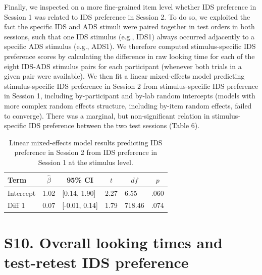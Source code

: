\documentclass[
  english,
  man, donotrepeattitle,floatsintext]{apa6}
\begin{document}
Finally, we inspected on a more fine-grained item level whether IDS preference in Session 1 was related to IDS preference in Session 2.
To do so, we exploited the fact the specific IDS and ADS stimuli were paired together in test orders in both sessions, such that one IDS stimulus (e.g., IDS1) always occurred adjacently to a specific ADS stimulus (e.g., ADS1).
We therefore computed stimulus-specific IDS preference scores by calculating the difference in raw looking time for each of the eight IDS-ADS stimulus pairs for each participant (whenever both trials in a given pair were available).
We then fit a linear mixed-effects model predicting stimulus-specific IDS preference in Session 2 from stimulus-specific IDS preference in Session 1, including by-participant and by-lab random intercepts (models with more complex random effects structure, including by-item random effects, failed to converge).
There was a marginal, but non-significant relation in stimulus-specific IDS preference between the two test sessions (Table 6).

\begin{table}[tbp]

\begin{center}
\begin{threeparttable}

\caption{\label{tab:unnamed-chunk-42}Linear mixed-effects model results predicting IDS preference in Session 2 from IDS preference in Session 1 at the stimulus level.}

\begin{tabular}{llllll}
\toprule
Term & \multicolumn{1}{c}{$\hat{\beta}$} & \multicolumn{1}{c}{95\% CI} & \multicolumn{1}{c}{$t$} & \multicolumn{1}{c}{$\mathit{df}$} & \multicolumn{1}{c}{$p$}\\
\midrule
Intercept & 1.02 & {}[0.14, 1.90] & 2.27 & 6.55 & .060\\
Diff 1 & 0.07 & {}[-0.01, 0.14] & 1.79 & 718.46 & .074\\
\bottomrule
\end{tabular}

\end{threeparttable}
\end{center}

\end{table}

\hypertarget{s10.-overall-looking-times-and-test-retest-ids-preference}{%
\section{S10. Overall looking times and test-retest IDS preference}\label{s10.-overall-looking-times-and-test-retest-ids-preference}}
\end{document}
